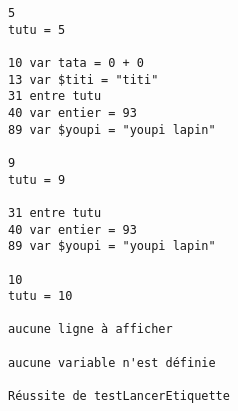 \begin{enum}
\begin{verbatim}
5
tutu = 5

10 var tata = 0 + 0
13 var $titi = "titi"
31 entre tutu
40 var entier = 93
89 var $youpi = "youpi lapin"

9
tutu = 9

31 entre tutu
40 var entier = 93
89 var $youpi = "youpi lapin"

10
tutu = 10

aucune ligne à afficher

aucune variable n'est définie

Réussite de testLancerEtiquette
\end{verbatim}
\end{enum}
